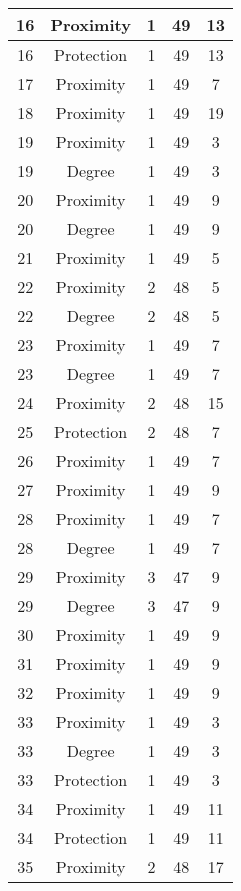 \documentclass[results.tex]{subfiles}
\begin{document}
\begin{center}
\begin{tabular}{| c || c | c | c | c |}
    \hline
    16 & Proximity & 1 & 49 & 13 \\ 
    \hline
    16 & Protection & 1 & 49 & 13 \\ 
    \hline
    17 & Proximity & 1 & 49 & 7 \\ 
    \hline
    18 & Proximity & 1 & 49 & 19 \\ 
    \hline
    19 & Proximity & 1 & 49 & 3 \\ 
    \hline
    19 & Degree & 1 & 49 & 3 \\ 
    \hline
    20 & Proximity & 1 & 49 & 9 \\ 
    \hline
    20 & Degree & 1 & 49 & 9 \\ 
    \hline
    21 & Proximity & 1 & 49 & 5 \\ 
    \hline
    22 & Proximity & 2 & 48 & 5 \\ 
    \hline
    22 & Degree & 2 & 48 & 5 \\ 
    \hline
    23 & Proximity & 1 & 49 & 7 \\ 
    \hline
    23 & Degree & 1 & 49 & 7 \\ 
    \hline
    24 & Proximity & 2 & 48 & 15 \\ 
    \hline
    25 & Protection & 2 & 48 & 7 \\ 
    \hline
    26 & Proximity & 1 & 49 & 7 \\ 
    \hline
    27 & Proximity & 1 & 49 & 9 \\ 
    \hline
    28 & Proximity & 1 & 49 & 7 \\ 
    \hline
    28 & Degree & 1 & 49 & 7 \\ 
    \hline
    29 & Proximity & 3 & 47 & 9 \\ 
    \hline
    29 & Degree & 3 & 47 & 9 \\ 
    \hline
    30 & Proximity & 1 & 49 & 9 \\ 
    \hline
    31 & Proximity & 1 & 49 & 9 \\ 
    \hline
    32 & Proximity & 1 & 49 & 9 \\ 
    \hline
    33 & Proximity & 1 & 49 & 3 \\ 
    \hline
    33 & Degree & 1 & 49 & 3 \\ 
    \hline
    33 & Protection & 1 & 49 & 3 \\ 
    \hline
    34 & Proximity & 1 & 49 & 11 \\ 
    \hline
    34 & Protection & 1 & 49 & 11 \\ 
    \hline
    35 & Proximity & 2 & 48 & 17 \\ 

\end{tabular}
\end{center}
\end{document}
